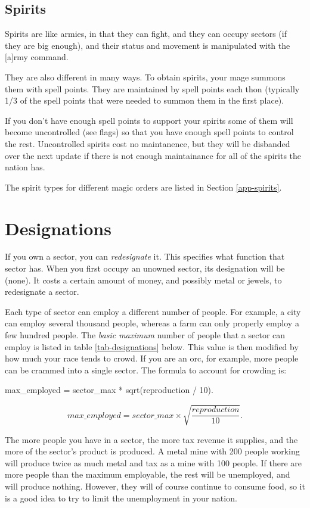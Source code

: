 \subsection{Spirits}

Spirits are like armies, in that they can fight, and they can occupy
sectors (if they are big enough), and their status and movement is
manipulated with the [a]rmy command.

They are also different in many ways.  To obtain spirits, your mage
summons them with spell points.  They are maintained by spell points
each thon (typically 1/3 of the spell points that were needed to
summon them in the first place).

If you don't have enough spell points to support your spirits some of
them will become uncontrolled (see flags) so that you have enough
spell points to control the rest.  Uncontrolled spirits cost no
maintanence, but they will be disbanded over the next update if there
is not enough maintainance for all of the spirits the nation has.

The spirit types for different magic orders are listed in Section
\ref{app-spirits}.

\section{Designations}
If you own a sector, you can {\em redesignate} it.  This specifies
what function that sector has.  When you first occupy an unowned
sector, its designation will be  (none).  It costs a certain
amount of money, and possibly metal or jewels, to redesignate a
sector.

Each type of sector can employ a different number of people.  For
example, a city can employ several thousand people, whereas a farm can
only properly employ a few hundred people.  The {\em basic maximum}
number of people that a sector can employ is listed in table
\ref{tab-designations} below.  This value is then modified by how
much your race tends to crowd.  If you are an orc, for example, more
people can be crammed into a single sector. The formula to account
for crowding is:
\begin{ifinfo}
	max_employed = sector_max * sqrt(reproduction / 10).
\end{ifinfo}
\begin{tex}
\[ max\_employed = sector\_max \times \sqrt{\frac{reproduction}{10}}. \]
\end{tex}

The more people you have in a sector, the more tax revenue it supplies,
and the more of the sector's product is produced.  A metal mine with
200 people working will produce twice as much metal and tax as a mine with
100 people.  If there are more people than the maximum employable, the
rest will be unemployed, and will produce nothing.  However, they will
of course continue to consume food, so it is a good idea to try to limit
the unemployment in your nation.

